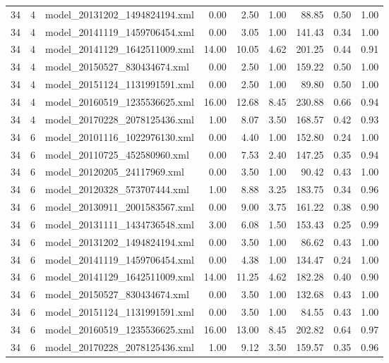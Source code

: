 \begin{table}[ht]
\begin{tabular}{rrlrrrrrr}
   34 &   4 & model\_20131202\_1494824194.xml & 0.00 & 2.50 & 1.00 & 88.85 & 0.50 & 1.00 \\ 
   34 &   4 & model\_20141119\_1459706454.xml & 0.00 & 3.05 & 1.00 & 141.43 & 0.34 & 1.00 \\ 
   34 &   4 & model\_20141129\_1642511009.xml & 14.00 & 10.05 & 4.62 & 201.25 & 0.44 & 0.91 \\ 
   34 &   4 & model\_20150527\_830434674.xml & 0.00 & 2.50 & 1.00 & 159.22 & 0.50 & 1.00 \\ 
   34 &   4 & model\_20151124\_1131991591.xml & 0.00 & 2.50 & 1.00 & 89.80 & 0.50 & 1.00 \\ 
   34 &   4 & model\_20160519\_1235536625.xml & 16.00 & 12.68 & 8.45 & 230.88 & 0.66 & 0.94 \\ 
   34 &   4 & model\_20170228\_2078125436.xml & 1.00 & 8.07 & 3.50 & 168.57 & 0.42 & 0.93 \\ 
   34 &   6 & model\_20101116\_1022976130.xml & 0.00 & 4.40 & 1.00 & 152.80 & 0.24 & 1.00 \\ 
   34 &   6 & model\_20110725\_452580960.xml & 0.00 & 7.53 & 2.40 & 147.25 & 0.35 & 0.94 \\ 
   34 &   6 & model\_20120205\_24117969.xml & 0.00 & 3.50 & 1.00 & 90.42 & 0.43 & 1.00 \\ 
   34 &   6 & model\_20120328\_573707444.xml & 1.00 & 8.88 & 3.25 & 183.75 & 0.34 & 0.96 \\ 
   34 &   6 & model\_20130911\_2001583567.xml & 0.00 & 9.00 & 3.75 & 161.22 & 0.38 & 0.90 \\ 
   34 &   6 & model\_20131111\_1434736548.xml & 3.00 & 6.08 & 1.50 & 153.43 & 0.25 & 0.99 \\ 
   34 &   6 & model\_20131202\_1494824194.xml & 0.00 & 3.50 & 1.00 & 86.62 & 0.43 & 1.00 \\ 
   34 &   6 & model\_20141119\_1459706454.xml & 0.00 & 4.38 & 1.00 & 134.47 & 0.24 & 1.00 \\ 
   34 &   6 & model\_20141129\_1642511009.xml & 14.00 & 11.25 & 4.62 & 182.28 & 0.40 & 0.90 \\ 
   34 &   6 & model\_20150527\_830434674.xml & 0.00 & 3.50 & 1.00 & 132.68 & 0.43 & 1.00 \\ 
   34 &   6 & model\_20151124\_1131991591.xml & 0.00 & 3.50 & 1.00 & 84.55 & 0.43 & 1.00 \\ 
   34 &   6 & model\_20160519\_1235536625.xml & 16.00 & 13.00 & 8.45 & 202.82 & 0.64 & 0.97 \\ 
   34 &   6 & model\_20170228\_2078125436.xml & 1.00 & 9.12 & 3.50 & 159.57 & 0.35 & 0.96 \\ 

\end{tabular}
\end{table}
